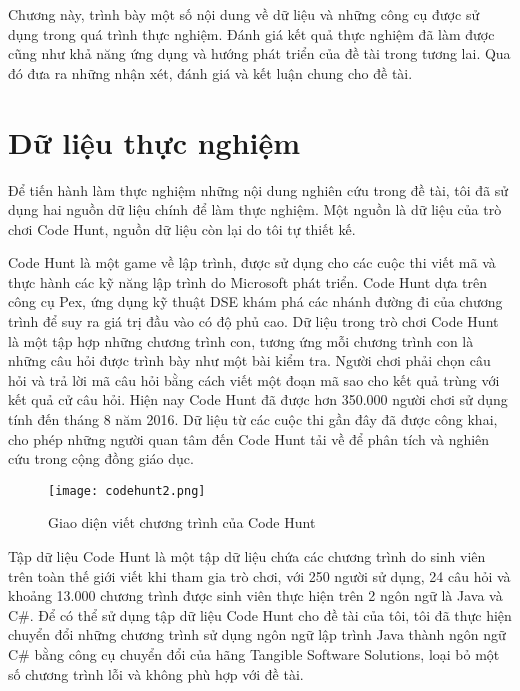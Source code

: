 Chương này, trình bày một số nội dung về dữ liệu và những công cụ được sử dụng trong quá trình thực nghiệm. Đánh giá kết quả thực nghiệm đã làm được cũng như khả năng ứng dụng và hướng phát triển của đề tài trong tương lai. Qua đó đưa ra những nhận xét, đánh giá và kết luận chung cho đề tài.

\section{Dữ liệu thực nghiệm}
Để tiến hành làm thực nghiệm những nội dung nghiên cứu trong đề tài, tôi đã sử dụng hai nguồn dữ liệu chính để làm thực nghiệm. Một nguồn là dữ liệu của trò chơi Code Hunt, nguồn dữ liệu còn lại do tôi tự thiết kế.

Code Hunt \cite{CodeHunt} là một game về lập trình, được sử dụng cho các cuộc thi viết mã và thực hành các kỹ năng lập trình do Microsoft phát triển. Code Hunt dựa trên công cụ Pex, ứng dụng kỹ thuật DSE khám phá các nhánh đường đi của chương trình để suy ra giá trị đầu vào có độ phủ cao. Dữ liệu trong trò chơi Code Hunt là một tập hợp những chương trình con, tương ứng mỗi chương trình con là những câu hỏi được trình bày như một bài kiểm tra. Người chơi phải chọn câu hỏi và trả lời mã câu hỏi bằng cách viết một đoạn mã sao cho kết quả trùng với kết quả cử câu hỏi. Hiện nay Code Hunt đã được hơn 350.000 người chơi sử dụng tính đến tháng 8 năm 2016. Dữ liệu từ các cuộc thi gần đây đã được công khai, cho phép những người quan tâm đến Code Hunt tải về để phân tích và nghiên cứu trong cộng đồng giáo dục.

\label{sec:data}
\begin{center}
	\begin{figure}[H]
		\begin{center}
			\texttt{[image: codehunt2.png]}
		\end{center}
		\caption{Giao diện viết chương trình của Code Hunt}
		\label{codehunt2}
	\end{figure}
\end{center}

Tập dữ liệu Code Hunt là một tập dữ liệu chứa các chương trình do sinh viên trên toàn thế giới viết khi tham gia trò chơi, với 250 người sử dụng, 24 câu hỏi và khoảng 13.000 chương trình được sinh viên thực hiện trên 2 ngôn ngữ là Java và C\#. Để có thể sử dụng tập dữ liệu Code Hunt cho đề tài của tôi, tôi đã thực hiện chuyển đổi những chương trình sử dụng ngôn ngữ lập trình Java thành ngôn ngữ C\# bằng công cụ chuyển đổi của hãng Tangible Software Solutions, loại bỏ một số chương trình lỗi và không phù hợp với đề tài.

